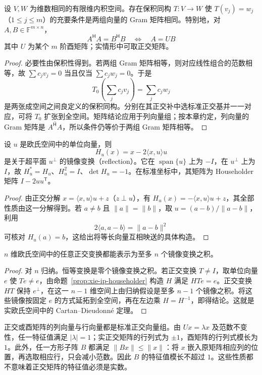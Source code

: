 \begin{proposition}
\label{prop:xie-ip-equal-gram}
设 $V,W$ 为维数相同的有限维内积空间。存在保积同构 $T:V\to W$ 使 $T(v_j)=w_j$（$1\leq j\leq m$）的充要条件是两组向量的 Gram 矩阵相同。特别地，对 $A,B\in\mathbb F^{m\times n}$，
\[
A^{\mathsf H}A=B^{\mathsf H}B\quad\Longleftrightarrow\quad A=UB
\]
其中 $U$ 为某个 $m$ 阶酉矩阵；实情形中可取正交矩阵。
\end{proposition}
\begin{proof}
必要性由保积性得到。若两组 Gram 矩阵相等，则对应线性组合的范数相等，故 $\sum c_jv_j=0$ 当且仅当 $\sum c_jw_j=0$。于是
\[
T_0\left(\sum_jc_jv_j\right)=\sum_jc_jw_j
\]
是两张成空间之间良定义的保积同构。分别在其正交补中选标准正交基并一一对应，可将 $T_0$ 扩张到全空间。矩阵结论应用于列向量组；按本章约定，列向量的 Gram 矩阵是 $\overline{A^{\mathsf H}A}$，所以条件仍等价于两组 Gram 矩阵相等。
\end{proof}

\begin{proposition}
\label{prop:xie-ip-householder}
设 $u$ 是欧氏空间中的单位向量，则
\[
H_u(x)=x-2\langle x,u\rangle u
\]
是关于超平面 $u^\perp$ 的镜像变换（reflection）。它在 $\operatorname{span}\{u\}$ 上为 $-I$，在 $u^\perp$ 上为 $I$，故 $H_u^*=H_u$、$H_u^2=I$、$\det H_u=-1$。在标准坐标中，其矩阵为 Householder 矩阵 $I-2uu^{\mathsf T}$。
\end{proposition}
\begin{proof}
由正交分解 $x=\langle x,u\rangle u+z$（$z\perp u$），有 $H_u(x)=-\langle x,u\rangle u+z$，其全部性质由这一分解得到。若 $a\ne b$ 且 $\|a\|=\|b\|$，取 $u=(a-b)/\|a-b\|$，利用
\[
2\langle a,a-b\rangle=\|a-b\|^2
\]
可核对 $H_u(a)=b$，这给出将等长向量互相映送的具体构造。
\end{proof}

\begin{theorem}
$n$ 维欧氏空间中的任意正交变换都能表示为至多 $n$ 个镜像变换之积。
\end{theorem}
\begin{proof}
对 $n$ 归纳。恒等变换是零个镜像变换之积。若正交变换 $T\ne I$，取单位向量 $e$ 使 $Te\ne e$，由命题~\ref{prop:xie-ip-householder} 构造 $H$ 满足 $HTe=e$。正交变换 $HT$ 保持 $e^\perp$，在这一 $n-1$ 维空间上由归纳假设是至多 $n-1$ 个镜像之积。将这些镜像按固定 $e$ 的方式延拓到全空间，再在左边乘 $H=H^{-1}$，即得结论。这就是实欧氏空间中的 Cartan--Dieudonn\'e 定理。
\end{proof}

正交或酉矩阵的列向量与行向量都是标准正交向量组。由 $Ux=\lambda x$ 及范数不变性，任一特征值满足 $|\lambda|=1$；实正交矩阵的行列式为 $\pm1$，酉矩阵的行列式模长为 $1$。此外，任一方形子阵 $B$ 都满足 $\|Bx\|\leq\|x\|$：将 $x$ 嵌入原矩阵相应列的位置，再选取相应行，只会减小范数。因此 $B$ 的特征值模长不超过 $1$。这些性质都不意味着正交矩阵的特征值必须是实数。

